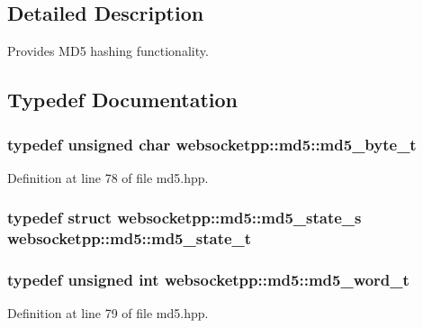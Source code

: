 \subsection{Detailed Description}
Provides M\+D5 hashing functionality. 

\subsection{Typedef Documentation}
\hypertarget{namespacewebsocketpp_1_1md5_a0c434041715d244182207c3413e36e71}{}
\subsubsection[{md5\+\_\+byte\+\_\+t}]{\setlength{\rightskip}{0pt plus 5cm}typedef unsigned char {\bf websocketpp\+::md5\+::md5\+\_\+byte\+\_\+t}}\label{namespacewebsocketpp_1_1md5_a0c434041715d244182207c3413e36e71}


Definition at line 78 of file md5.\+hpp.

\hypertarget{namespacewebsocketpp_1_1md5_a4be84c20ee3f9d9c76d4e2f7befe2eff}{}
\subsubsection[{md5\+\_\+state\+\_\+t}]{\setlength{\rightskip}{0pt plus 5cm}typedef struct {\bf websocketpp\+::md5\+::md5\+\_\+state\+\_\+s}  {\bf websocketpp\+::md5\+::md5\+\_\+state\+\_\+t}}\label{namespacewebsocketpp_1_1md5_a4be84c20ee3f9d9c76d4e2f7befe2eff}
\hypertarget{namespacewebsocketpp_1_1md5_a0ece422ac11bb1332dcf342ced42ac96}{}
\subsubsection[{md5\+\_\+word\+\_\+t}]{\setlength{\rightskip}{0pt plus 5cm}typedef unsigned int {\bf websocketpp\+::md5\+::md5\+\_\+word\+\_\+t}}\label{namespacewebsocketpp_1_1md5_a0ece422ac11bb1332dcf342ced42ac96}


Definition at line 79 of file md5.\+hpp.



